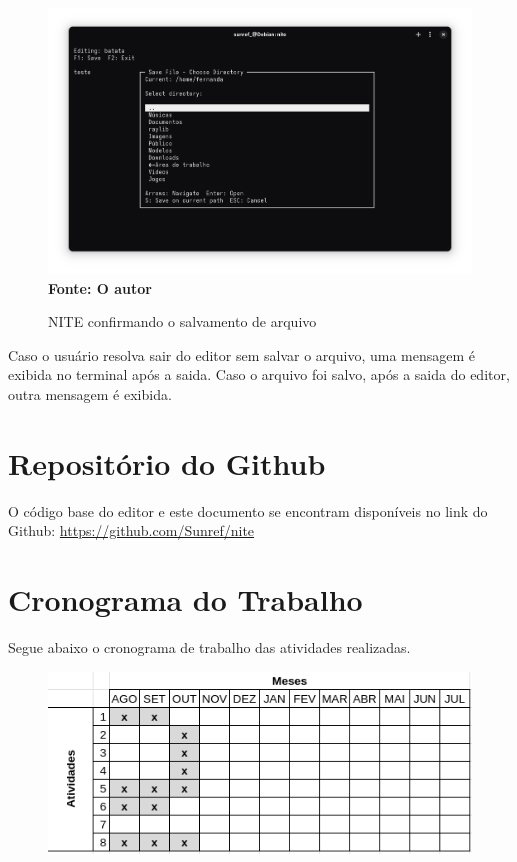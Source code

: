 \FloatBarrier
\begin{figure}[!htbp]
    \centering
    \caption{NITE confirmando o salvamento de arquivo}
    \includegraphics[scale=0.3]{imagens/ConfirmSave.png}
    \\\textbf{Fonte: O autor} \label{fig:ConfirmSave}
\end{figure}
\FloatBarrier

Caso o usuário resolva sair do editor sem salvar o arquivo, uma mensagem é exibida no terminal após a saida. Caso o arquivo foi salvo, após a saida
do editor, outra mensagem é exibida.

\section{Repositório do Github}

O código base do editor e este documento se encontram disponíveis no link do Github: \url{https://github.com/Sunref/nite}

\section{Cronograma do Trabalho}

Segue abaixo o cronograma de trabalho das atividades realizadas.

\FloatBarrier
\begin{figure}[!htbp]
	\centering
	\includegraphics[scale=0.4]{imagens/cronograma.png}
\end{figure}
\FloatBarrier

